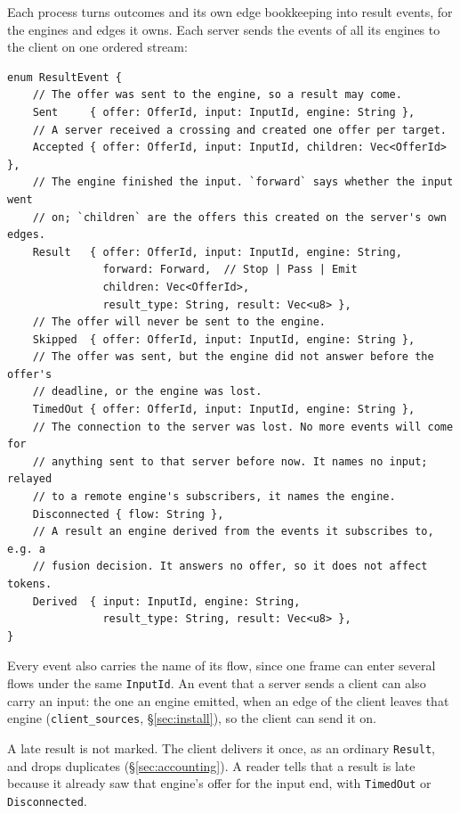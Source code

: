 \documentclass[11pt]{article}
\newcommand{\code}[1]{\texttt{#1}}
\begin{document}
Each process turns outcomes and its own edge bookkeeping into result events,
for the engines and edges it owns. Each server sends the events of all its
engines to the client on one ordered stream:
\begin{lstlisting}
enum ResultEvent {
    // The offer was sent to the engine, so a result may come.
    Sent     { offer: OfferId, input: InputId, engine: String },
    // A server received a crossing and created one offer per target.
    Accepted { offer: OfferId, input: InputId, children: Vec<OfferId> },
    // The engine finished the input. `forward` says whether the input went
    // on; `children` are the offers this created on the server's own edges.
    Result   { offer: OfferId, input: InputId, engine: String,
               forward: Forward,  // Stop | Pass | Emit
               children: Vec<OfferId>,
               result_type: String, result: Vec<u8> },
    // The offer will never be sent to the engine.
    Skipped  { offer: OfferId, input: InputId, engine: String },
    // The offer was sent, but the engine did not answer before the offer's
    // deadline, or the engine was lost.
    TimedOut { offer: OfferId, input: InputId, engine: String },
    // The connection to the server was lost. No more events will come for
    // anything sent to that server before now. It names no input; relayed
    // to a remote engine's subscribers, it names the engine.
    Disconnected { flow: String },
    // A result an engine derived from the events it subscribes to, e.g. a
    // fusion decision. It answers no offer, so it does not affect tokens.
    Derived  { input: InputId, engine: String,
               result_type: String, result: Vec<u8> },
}
\end{lstlisting}
Every event also carries the name of its flow, since one frame can enter
several flows under the same \code{InputId}. An event that a server sends a
client can also carry an input: the one an engine emitted, when an edge of
the client leaves that engine (\code{client\_sources}, \S\ref{sec:install}),
so the client can send it on.

A late result is not marked. The client delivers it once, as an ordinary
\code{Result}, and drops duplicates (\S\ref{sec:accounting}). A reader tells
that a result is late because it already saw that engine's offer for the
input end, with \code{TimedOut} or \code{Disconnected}.
\end{document}
